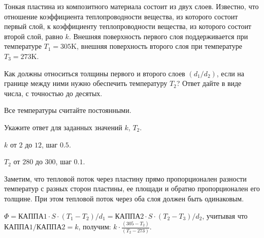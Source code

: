 
Тонкая пластина из композитного материала состоит из двух слоев. 
Известно, что отношение коэффициента теплопроводности вещества, из которого состоит первый слой, 
к коэффициенту теплопроводности вещества, из которого состоит второй слой, равно $k$. 
Внешняя поверхность первого слоя поддерживается при температуре \linebreak $T_1 = 305$K, внешняя поверхность 
второго слоя при температуре $T_3 = 273$K. 

Как должны относиться толщины первого и второго слоев $(d_1 / d_2)$, если на границе между ними нужно 
обеспечить температуру $T_2$? Ответ дайте в виде числа, с точностью до десятых. 

Все температуры считайте постоянными.

Укажите ответ для заданных значений $k$, $T_2$.

\paramSection

$k$ от $2$ до $12$, шаг $0.5$.

$T_2$ от $280$ до $300$, шаг $0.1$.

\solutionSection

Заметим, что тепловой поток через пластину прямо пропорционален разности температур с разных сторон пластины, 
ее площади и обратно пропорционален его толщине. При этом тепловой поток через оба слоя должен быть одинаковым.

$\Phi= \text{КАППА1} \cdot S \cdot (T_1-T_2)/d_1 = \text{КАППА2} \cdot S \cdot (T_2-T_3)/d_2$, учитывая что $\text{КАППА1}/ \text{КАППА2} = k$, получим: $k \cdot \frac{(305-T_2)}{(T_2-273)}$.

